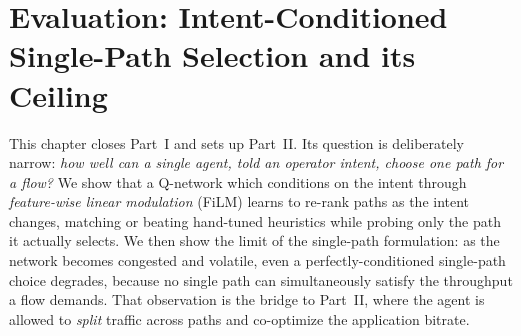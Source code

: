 %
%

\newcommand{\chsixdir}{chapter6}          %
\newcommand{\filmDivergence}{0.128}       %
\newcommand{\concatDivergence}{0.050}     %
\newcommand{\flatDivergence}{0.011}       %
\newcommand{\probeReductionPct}{97.5\%}   %
\newcommand{\filmProbeMs}{\SI{135}{\milli\second}}
\newcommand{\widestProbeMs}{\SI{5388}{\milli\second}}
\newcommand{\filmGoodputHi}{9067\,Mbps}   %
\newcommand{\filmGoodputLo}{6844\,Mbps}   %
\newcommand{\latencyIntentMs}{\SI{12.8}{\milli\second}}  %
\newcommand{\otherIntentMs}{\SI{16}{\milli\second}}      %

\chapter{Evaluation: Intent-Conditioned Single-Path Selection and its Ceiling}
\label{ch:evaluation}

This chapter closes Part~I and sets up Part~II. Its question is deliberately
narrow: \emph{how well can a single agent, told an operator intent, choose one
path for a flow?} We show that a Q-network which conditions on the intent through
\emph{feature-wise linear modulation} (FiLM) learns to re-rank paths as the
intent changes, matching or beating hand-tuned heuristics while probing only the
path it actually selects. We then show the limit of the single-path formulation:
as the network becomes congested and volatile, even a perfectly-conditioned
single-path choice degrades, because no single path can simultaneously satisfy
the throughput a flow demands. That observation is the bridge to Part~II, where
the agent is allowed to \emph{split} traffic across paths and co-optimize the
application bitrate.

